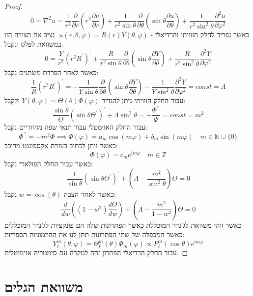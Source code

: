 \documentclass{tstextbook}
\begin{document}
\begin{proof}
$$0=\nabla^{2}u={\frac{1}{r^{2}}}{\frac{\partial}{\partial r}}\left(r^{2}{\frac{\partial u}{\partial r}}\right)+{\frac{1}{r^{2}\sin\theta}}{\frac{\partial}{\partial\theta}}\left(\sin\theta{\frac{\partial u}{\partial\theta}}\right)+{\frac{1}{r^{2}\sin^{2}\theta}}{\frac{\partial^{2}u}{\partial\varphi^{2}}}$$
כאשר נפריד לחלק הזוויתי והרדיאלי - \(u\left( r,\theta,\varphi \right)=R(r)Y\left( \theta,\varphi \right)\). נציב את הצורה הזו במשוואת לפלס ונקבל:
$$0=\frac{Y}{r^{2}}\left(r^{2}R^{\prime}\right)^{\prime}+\frac{R}{r^{2}\sin\theta}\frac{\partial}{\partial\theta}\left(\sin\theta\frac{\partial Y}{\partial\theta}\right)+\frac{R}{r^{2}\sin^{2}\theta}\frac{\partial^{2}Y}{\partial\varphi^{2}}$$
כאשר לאחר הפרדת משתנים נקבל:
$${\frac{1}{R}}\left(r^{2}R^{\prime}\right)^{\prime}=-{\frac{1}{Y\sin\theta}}{\frac{\partial}{\partial\theta}}\left(\sin\theta{\frac{\partial Y}{\partial\theta}}\right)-{\frac{1}{Y\sin^{2}\theta}}{\frac{\partial^{2}Y}{\partial\varphi^{2}}}=c o n s t=\Lambda$$
עבור החלק הזוויתי ניתן להגדיר \(Y\left( \theta,\varphi \right)=\Theta\left( \theta \right)\Phi\left( \varphi \right)\) ולקבל:
$$\frac{\sin\theta}{\Theta}\left(\sin\theta\Theta^{\prime}\right)^{\prime}+\Lambda\sin^{2}\theta=-\frac{\Phi^{\prime\prime}}{\Phi}=c o n s t=m^{2}$$
עבור החלק האזימטלי עבור תנאי שפה מחזוריים נקבל:
$$\Phi^{\prime\prime}=-m^{2}\Phi\implies \Phi\left( \varphi \right)=a_{m}\cos\left( m\varphi \right)+b_{m}\sin\left( m\varphi \right) \quad  m \in \mathbb{N}\cup \{ 0 \}$$
כאשר ניתן לכתוב בעזרת אקספוננט מרוכב:
$$\Phi\left( \varphi \right)=c_{m}e^{i m\varphi}\quad m \in \mathbb{Z}$$
כאשר עבור החלק הפולארי נקבל:
$$\frac{1}{\sin\theta}\left(\sin\theta\Theta^{\prime}\right)^{\prime}+\left(\Lambda-\frac{m^{2}}{\sin^{2}\theta}\right)\Theta=0$$
כאשר לאחר הצבה \(w=\cos\left( \theta \right)\) נקבל:
$$\frac{d}{d w}\left((1-w^{2})\frac{d\Theta}{d w}\right)+\left(\Lambda-\frac{m^{2}}{1-w^{2}}\right)\Theta=0$$
כאשר זוהי משוואת לג'נדר המוכללת כאשר הפתרונות שלה הם פונקציות לג'נדר המוכללים כאשר המכפלה של שתי הפתרונות תתן לנו את ההרמוניות הספריות:
$$Y_{\ell}^{m}(\theta,\varphi)=\Theta_{\ell}^{m}(\theta)\Phi_{m}(\varphi)\propto P_{\ell}^{m}(\cos\theta)e^{i m\varphi}$$
עבור החלק הרדיאלי הפתרון זהה למקרה עם סימטריה אזימוטלית.

\end{proof}

\section{משוואת הגלים}
\end{document}
